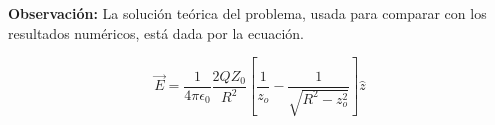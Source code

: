 \textbf{Observación:} La solución teórica del problema, usada para comparar con los resultados numéricos, está dada por la ecuación.

\begin{equation}
    \vec{E} =
    \frac{1}{4\pi \epsilon_0} \frac{2QZ_0}{R^2} 
    \left[
        \frac{1}{z_o} - \frac{1}{\sqrt{R^2-z_o^2}}
    \right]
    \hat{z}
\end{equation}